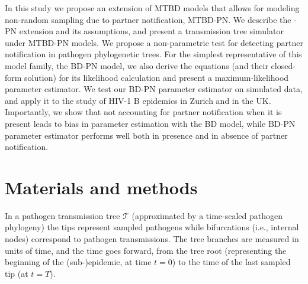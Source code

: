 \documentclass[10pt,letterpaper]{article}
\begin{document}
In this study we propose an extension of MTBD models that allows for modeling non-random sampling due to partner notification, MTBD-PN. We describe the -PN extension and its assumptions, and present a transmission tree simulator under MTBD-PN models. We propose a non-parametric test for detecting partner notification in pathogen phylogenetic trees. For the simplest representative of this model family, the BD-PN model, we also derive the equations (and their closed-form solution) for its likelihood calculation and present a maximum-likelihood parameter estimator. We test our BD-PN parameter estimator on simulated data, and apply it to the study of HIV-1 B epidemics in Zurich and in the UK. Importantly, we show that not accounting for partner notification when it is present leads to bias in parameter estimation with the BD model, while BD-PN parameter estimator performs well both in presence and in absence of partner notification.

\section*{Materials and methods}
In a pathogen transmission tree $\mathscr{T}$ (approximated by a time-scaled pathogen phylogeny) the tips represent sampled pathogens %
while bifurcations (i.e., internal nodes) correspond to pathogen transmissions. %
The tree branches are measured in units of time, and the time goes forward, from the tree root (representing the beginning of the (sub-)epidemic, at time $t=0$) to the time of the last sampled tip (at $t=T$). 

%
\end{document}
